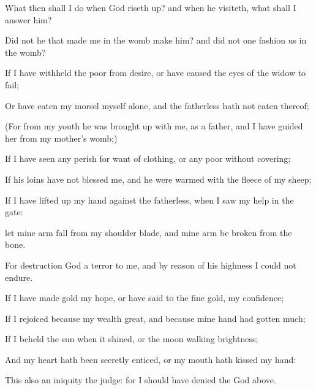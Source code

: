 {What then shall I
do when
God riseth
up? and when he
visiteth, what shall I
answer him?

Did not he that
made me in the
womb
make him? and did not
one
fashion us in the
womb?


\par }{\PP {}If I have
withheld the
poor from
{}
desire, or have caused the
eyes of the
widow to
fail;

Or have
eaten my
morsel myself alone, and the
fatherless hath not
eaten thereof;

(For from my
youth he was brought
up with me, as
{} a
father, and I have
guided her from my
mother’s
womb;)

If I have
seen any
perish for want of
clothing, or any
poor without
covering;

If his
loins have not
blessed me, and
{} he were
{}
warmed with the
fleece of my
sheep;

If I have lifted
up my
hand against the
fatherless, when I
saw my
help in the
gate:

 let mine
arm
fall from my shoulder
blade, and mine
arm be
broken from the
bone.

For
destruction
{}
God
{} a
terror to me, and by reason of his
highness I
could not endure.


\par }{\PP {}If I have
made
gold my
hope, or have
said to the fine
gold,
{} my
confidence;

If I
rejoiced because my
wealth
{}
great, and because mine
hand had
gotten
much;

If I
beheld the
sun when it
shined, or the
moon
walking
{}
brightness;

And my
heart hath been
secretly
enticed, or my
mouth hath
kissed my
hand:

This also
{} an
iniquity
{} the
judge: for I should have
denied the
God
{}
above.

}
